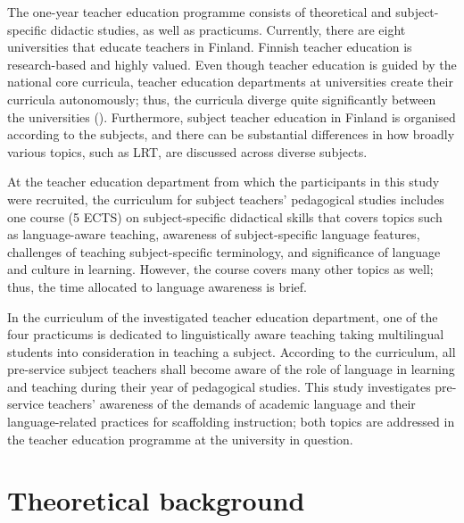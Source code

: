 \documentclass[output=paper]{langscibook}
\begin{document}
The one-year teacher education programme consists of theoretical and subject-specific didactic studies, as well as practicums. Currently, there are eight universities that educate teachers in Finland. Finnish teacher education is research-based and highly valued. Even though teacher education is guided by the national core curricula, teacher education departments at universities create their curricula autonomously; thus, the curricula diverge quite significantly between the universities (\citealt{Szabo2021}). Furthermore, subject teacher education in Finland is organised according to the subjects, and there can be substantial differences in how broadly various topics, such as LRT, are discussed across diverse subjects.

At the teacher education department from which the participants in this study were recruited, the curriculum for subject teachers’ pedagogical studies includes one course (5 ECTS) on subject\hyp specific didactical skills that covers topics such as language-aware teaching, awareness of subject\hyp specific language features, challenges of teaching subject-specific terminology, and significance of language and culture in learning. However, the course covers many other topics as well; thus, the time allocated to language awareness is brief.

In the curriculum of the investigated teacher education department, one of the four practicums is dedicated to linguistically aware teaching taking multilingual students into consideration in teaching a subject. According to the curriculum, all pre-service subject teachers shall become aware of the role of language in learning and teaching during their year of pedagogical studies. This study investigates pre-service teachers’ awareness of the demands of academic language and their language-related practices for scaffolding instruction; both topics are addressed in the teacher education programme at the university in question.     

\section{Theoretical background}\label{sec:heikkola:3}
\end{document}
